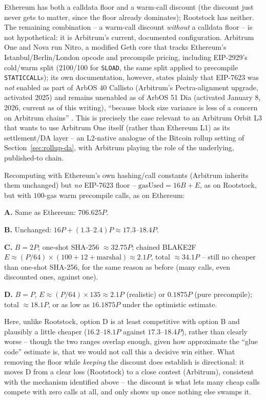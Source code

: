 Ethereum has both a calldata floor and a warm-call discount (the discount
just never gets to matter, since the floor already dominates); Rootstock
has neither. The remaining combination -- a warm-call discount
\emph{without} a calldata floor -- is not hypothetical: it is Arbitrum's
current, documented configuration. Arbitrum One and Nova run Nitro, a
modified Geth core that tracks Ethereum's Istanbul/Berlin/London opcode
and precompile pricing, including EIP-2929's cold/warm split (2100/100 for
\texttt{SLOAD}, the same split applied to precompile
\texttt{STATICCALL}s); its own documentation, however, states plainly that
EIP-7623 was \emph{not} enabled as part of ArbOS 40 Callisto (Arbitrum's
Pectra-alignment upgrade, activated 2025) and remains unenabled as of
ArbOS 51 Dia (activated January 8, 2026, current as of this writing),
``because block size variance is less of a concern on Arbitrum chains''
\citep{arbos40,arbos51}. This is precisely the case relevant to an
Arbitrum Orbit L3 that wants to use Arbitrum One itself (rather than
Ethereum L1) as its settlement/DA layer -- an L2-native analogue of the
Bitcoin rollup setting of Section~\ref{sec:rollup-da}, with Arbitrum
playing the role of the underlying, published-to chain.

Recomputing with Ethereum's own hashing/call constants (Arbitrum inherits
them unchanged) but \emph{no} EIP-7623 floor -- $\mathrm{gasUsed}=16B+E$,
as on Rootstock, but with $100$-gas warm precompile calls, as on Ethereum:

\textbf{A.} Same as Ethereum: $706.625P$.

\textbf{B.} Unchanged: $16P + (1.3\text{--}2.4)P \approx
17.3\text{--}18.4P$.

\textbf{C.} $B=2P$; one-shot SHA-256 $\approx 32.75P$; chained BLAKE2F
$E\approx(P/64)\times(100+12+\text{marshal})\approx 2.1P$, total
$\approx 34.1P$ -- still no cheaper than one-shot SHA-256, for the same
reason as before (many calls, even discounted ones, against one).

\textbf{D.} $B=P$, $E\approx(P/64)\times 135\approx 2.1P$ (realistic) or
$0.1875P$ (pure precompile); total $\approx 18.1P$, or as low as
$16.1875P$ under the optimistic estimate.

Here, unlike Rootstock, option D is at least competitive with option B
and plausibly a little cheaper ($16.2$--$18.1P$ against
$17.3$--$18.4P$), rather than clearly worse -- though the two ranges
overlap enough, given how approximate the ``glue code'' estimate is, that
we would not call this a decisive win either. What removing the floor
while \emph{keeping} the discount does establish is directional: it moves
D from a clear loss (Rootstock) to a close contest (Arbitrum), consistent
with the mechanism identified above -- the discount is what lets many
cheap calls compete with zero calls at all, and only shows up once
nothing else swamps it.

